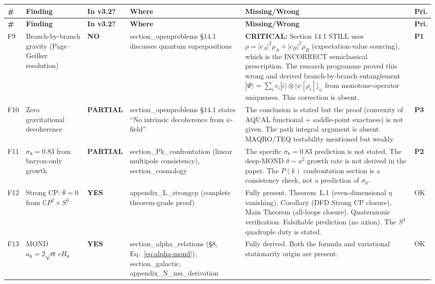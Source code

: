 \documentclass[11pt,a4paper]{article}
\newcommand{\YES}{\textcolor{yes}{\textbf{YES}}}
\newcommand{\PARTIAL}{\textcolor{partial}{\textbf{PARTIAL}}}
\newcommand{\NO}{\textcolor{no}{\textbf{NO}}}
\begin{document}
\begin{longtable}{|p{0.5cm}|p{3.5cm}|p{1.2cm}|p{3.5cm}|p{4.5cm}|p{1cm}|}
\hline
\textbf{\#} & \textbf{Finding} & \textbf{In v3.2?} & \textbf{Where} & \textbf{Missing/Wrong} & \textbf{Pri.} \\
\hline
\endfirsthead
\hline
\textbf{\#} & \textbf{Finding} & \textbf{In v3.2?} & \textbf{Where} & \textbf{Missing/Wrong} & \textbf{Pri.} \\
\hline
\endhead

F9 & Branch-by-branch gravity (Page--Geilker resolution) &
\NO &
section\_openproblems \S14.1 discusses quantum superpositions &
\textbf{CRITICAL:} Section 14.1 STILL uses $\rho = |c_A|^2\rho_A + |c_B|^2\rho_B$ (expectation-value sourcing), which is the INCORRECT semiclassical prescription. The research programme proved this wrong and derived branch-by-branch entanglement $|\Psi\rangle = \sum_i c_i |i\rangle \otimes |\psi[\rho_i]\rangle_\psi$ from monotone-operator uniqueness. This correction is absent. &
\textcolor{critical}{\textbf{P1}} \\
\hline

F10 & Zero gravitational decoherence &
\PARTIAL &
section\_openproblems \S14.1 states ``No intrinsic decoherence from $\psi$-field'' &
The conclusion is stated but the proof (convexity of AQUAL functional + saddle-point exactness) is not given. The path integral argument is absent. MAQRO/TEQ testability mentioned but weakly. &
\textbf{P3} \\
\hline

F11 & $\sigma_8 = 0.83$ from baryon-only growth &
\PARTIAL &
section\_Pk\_confrontation (linear multipole consistency), section\_cosmology &
The specific $\sigma_8 = 0.83$ prediction is not stated. The deep-MOND $\delta \sim a^2$ growth rate is not derived in the paper. The $P(k)$ confrontation section is a consistency check, not a prediction of $\sigma_8$. &
\textbf{P2} \\
\hline

F12 & Strong CP: $\bar{\theta} = 0$ from $\mathbb{C}P^2 \times S^3$ &
\YES &
appendix\_L\_strongcp (complete theorem-grade proof) &
Fully present. Theorem~L.1 (even-dimensional $\eta$ vanishing), Corollary (DFD Strong CP closure), Main Theorem (all-loops closure). Quaternionic verification. Falsifiable prediction (no axion). The $S^3$ quadruple duty is stated. &
OK \\
\hline

F13 & MOND $a_0 = 2\sqrt{\alpha}\,cH_0$ &
\YES &
section\_alpha\_relations (\S8, Eq.~\eqref{eq:alpha-mond}), section\_galactic, appendix\_N\_mu\_derivation &
Fully derived. Both the formula and variational stationarity origin are present. &
OK \\
\hline


\end{longtable}
\end{document}
